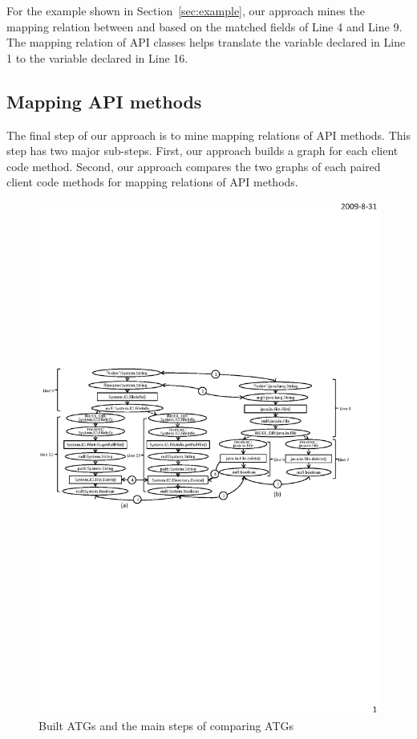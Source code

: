 For the example shown in Section~\ref{sec:example}, our approach
mines the mapping relation between  and
 based on the matched fields of Line 4
and Line 9. The mapping relation of API classes helps translate the
variable declared in Line 1 to the variable declared in Line 16.

\subsection{Mapping API methods}
\label{sec:approach:mappingtypes} The final step of our approach is
to mine mapping relations of API methods. This step has two major
sub-steps. First, our approach builds a graph for each client code
method. Second, our approach compares the two graphs of each paired
client code methods for mapping relations of API methods.

\begin{figure}[t]
\centering
\includegraphics[scale=1.1,clip]{figure/graph.eps}\vspace*{-1.5ex}
 \caption
{\label{fig:graph}Built ATGs and the main steps of comparing
ATGs}\vspace*{-3.5ex}
\end{figure}

